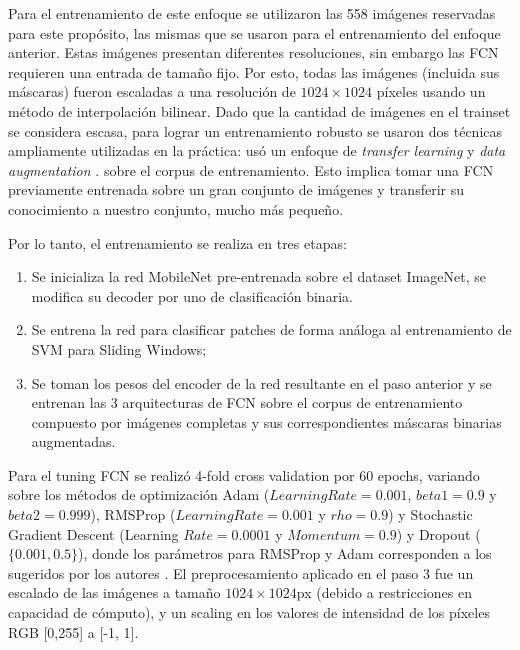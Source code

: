 \documentclass[a4paper,authoryear,review]{elsarticle}
\begin{document}
Para el entrenamiento de este enfoque se utilizaron las 558 imágenes reservadas para este propósito, las mismas que se usaron para el entrenamiento del enfoque anterior. Estas imágenes presentan diferentes resoluciones, sin embargo las FCN requieren una entrada de tamaño fijo. Por esto, todas las imágenes (incluida sus máscaras) fueron escaladas a una resolución de $1024 \times 1024$ píxeles usando un método de interpolación bilinear. Dado que la cantidad de imágenes en el trainset se considera escasa, para lograr un entrenamiento robusto se usaron dos técnicas ampliamente utilizadas en la práctica: usó un enfoque de \emph{transfer learning} \cite{pan2009survey} y \emph{data augmentation} \cite{shorten2019survey}. sobre el corpus de entrenamiento. Esto implica tomar una FCN previamente entrenada sobre un gran conjunto de imágenes y transferir su conocimiento a nuestro conjunto, mucho más pequeño. 

Por lo tanto, el entrenamiento se realiza en tres etapas:

\begin{enumerate}
	\item Se inicializa la red MobileNet pre-entrenada sobre el dataset ImageNet, se modifica su decoder por uno de clasificación binaria.
	\item Se entrena la red para clasificar patches de forma análoga al entrenamiento de SVM para Sliding Windows;
	\item Se toman los pesos del encoder de la red resultante en el paso anterior y se entrenan las 3 arquitecturas de FCN sobre el corpus de entrenamiento compuesto por imágenes completas y sus correspondientes máscaras binarias augmentadas.
\end{enumerate}
%
Para el tuning FCN se realizó 4-fold cross validation por 60 epochs, variando sobre los métodos de optimización Adam ($Learning Rate = 0.001$, $beta1= 0.9$ y $beta2 = 0.999$), RMSProp ($Learning Rate = 0.001$ y $rho = 0.9$) y Stochastic Gradient Descent (Learning $Rate = 0.0001$ y $Momentum = 0.9$) y Dropout ($\{0.001, 0.5\}$), donde los parámetros para RMSProp y Adam corresponden a los sugeridos por los autores \cite{ruder2018gradientdescent}. El preprocesamiento aplicado en el paso 3 fue un escalado de las imágenes a tamaño $1024 \times 1024$px (debido a restricciones en capacidad de cómputo), y un scaling en los valores de intensidad de los píxeles RGB [0,255] a [-1, 1].
\end{document}
